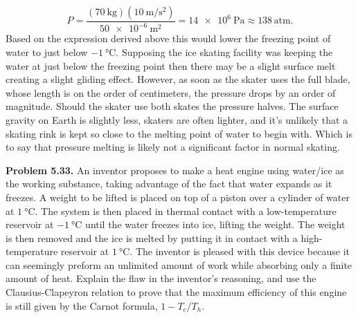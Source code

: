 \documentclass[a4paper, 12pt]{config/homework}
\begin{document}
\begin{enumerate}[label=\textbf{(\alph*)}]
\[P = \frac{\left(\qty{70}{\kilogram}\right)\left(\qty{10}{\meter\per\second\squared}\right)}{\qty{50e-6}{\meter\squared}} = \qty{14e6}{\pascal} \approx 138\,\text{atm}.\]
Based on the expression derived above this would lower the freezing point of water to just below \(\qty{-1}{\celsius}\). Supposing the ice skating facility was keeping the water at just below the freezing point then there may be a slight surface melt creating a slight gliding effect. However, as soon as the skater uses the full blade, whose length is on the order of centimeters, the pressure drops by an order of magnitude. Should the skater use both skates the pressure halves. The surface gravity on Earth is slightly less, skaters are often lighter, and it's unlikely that a skating rink is kept so close to the melting point of water to begin with. Which is to say that pressure melting is likely not a significant factor in normal skating.
\end{enumerate}

\pagebreak\noindent
\textbf{Problem 5.33.} An inventor proposes to make a heat engine using water/ice as the working substance, taking advantage of the fact that water expands as it freezes. A weight to be lifted is placed on top of a piston over a cylinder of water at \(\qty{1}{\celsius}\). The system is then placed in thermal contact with a low-temperature reservoir at \(\qty{-1}{\celsius}\) until the water freezes into ice, lifting the weight. The weight is then removed and the ice is melted by putting it in contact with a high-temperature reservoir at \(\qty{1}{\celsius}\). The inventor is pleased with this device because it can seemingly preform an unlimited amount of work while absorbing only a finite amount of heat. Explain the flaw in the inventor's reasoning, and use the Clausius-Clapeyron relation to prove that the maximum efficiency of this engine is still given by the Carnot formula, \(1 - T_c/T_h\).
\end{document}
